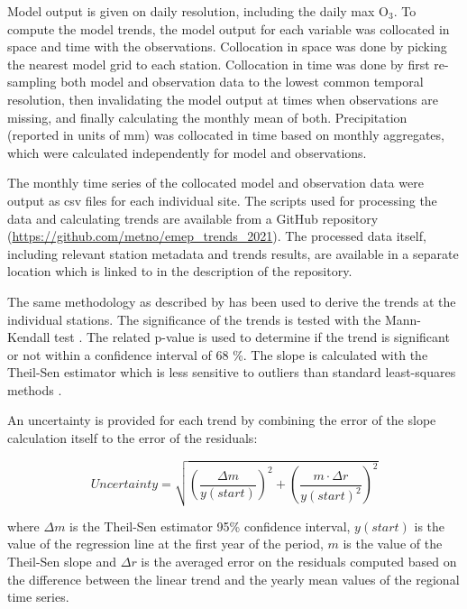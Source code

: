 Model output is given on daily resolution, including the daily max O$_3$. To compute the model trends, the model output for each variable was collocated in space and time with the observations. Collocation in space was done by picking the nearest model grid to each station. Collocation in time was done by first re-sampling both model and observation data to the lowest common temporal resolution, then invalidating the model output at times when observations are missing, and finally calculating the monthly mean of both. Precipitation (reported in units of mm) was collocated in time based on monthly aggregates, which were calculated independently for model and observations.

The monthly time series of the collocated model and observation data were output as csv files for each individual site. The scripts used for processing the data and calculating trends are available from a GitHub repository (\url{https://github.com/metno/emep_trends_2021}). The processed data itself, including relevant station metadata and trends results, are available in a separate location which is linked to in the description of the repository.

The same methodology as described by \cite{aas2019global, mortier2020} has been used to derive the trends at the individual stations. The significance of the trends is tested with the Mann-Kendall test \citep{hamed1998modified}. The related p-value is used to determine if the trend is significant or not within a confidence interval of 68 \%. The slope is calculated with the Theil-Sen estimator which is less sensitive to outliers than standard least-squares methods \citep{sen1968estimates}.

An uncertainty is provided for each trend by combining the error of the slope calculation itself to the error of the residuals:

\begin{equation}
 Uncertainty = \sqrt{{\left (\frac{\Delta m}{y(start)}\right )}^{2} + {\left ( \frac{m \cdot \Delta r}{y(start)^2}\right )}^{2} }
\end{equation}

where $\Delta m$ is the Theil-Sen estimator 95\% confidence interval, $y(start)$ is the value of the regression line at the first year of the period, $m$ is the value of the Theil-Sen slope and $\Delta r$ is the averaged error on the residuals computed based on the difference between the linear trend and the yearly mean values of the regional time series.

